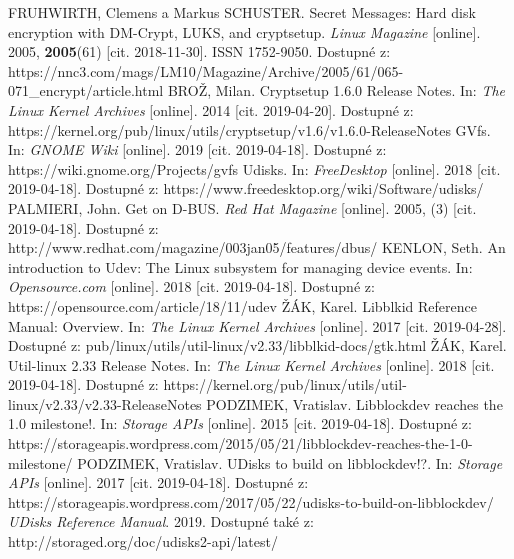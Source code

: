 \documentclass[a4paper,12pt]{article}
\begin{document}
{
FRUHWIRTH, Clemens a Markus SCHUSTER. Secret Messages: Hard disk encryption with DM-Crypt, LUKS, and cryptsetup. \textit{Linux Magazine} [online]. 2005, \textbf{2005}(61) [cit. 2018-11-30]. ISSN 1752-9050. Dostupné z: https://nnc3.com/mags/LM10/Magazine/Archive/2005/61/065-071\_encrypt/article.html
BROŽ, Milan. Cryptsetup 1.6.0 Release Notes. In: \textit{The Linux Kernel Archives} [online]. 2014 [cit. 2019-04-20]. Dostupné z: https://kernel.org/pub/linux/utils/cryptsetup/v1.6/v1.6.0-ReleaseNotes
GVfs. In: \textit{GNOME Wiki} [online]. 2019 [cit. 2019-04-18]. Dostupné z: https://wiki.gnome.org/Projects/gvfs
Udisks. In: \textit{FreeDesktop} [online]. 2018 [cit. 2019-04-18]. Dostupné z: https://www.freedesktop.org/wiki/Software/udisks/
PALMIERI, John. Get on D-BUS. \textit{Red Hat Magazine} [online]. 2005, (3) [cit. 2019-04-18]. Dostupné z: http://www.redhat.com/magazine/003jan05/features/dbus/
KENLON, Seth. An introduction to Udev: The Linux subsystem for managing device events. In: \textit{Opensource.com} [online]. 2018 [cit. 2019-04-18]. Dostupné z: https://opensource.com/article/18/11/udev
ŽÁK, Karel. Libblkid Reference Manual: Overview. In: \textit{The Linux Kernel Archives} [online]. 2017 [cit. 2019-04-28]. Dostupné z: pub/linux/utils/util-linux/v2.33/libblkid-docs/gtk.html
ŽÁK, Karel. Util-linux 2.33 Release Notes. In: \textit{The Linux Kernel Archives} [online]. 2018 [cit. 2019-04-18]. Dostupné z: https://kernel.org/pub/linux/utils/util-linux/v2.33/v2.33-ReleaseNotes
PODZIMEK, Vratislav. Libblockdev reaches the 1.0 milestone!. In: \textit{Storage APIs} [online]. 2015 [cit. 2019-04-18]. Dostupné z: https://storageapis.wordpress.com/2015/05/21/libblockdev-reaches-the-1-0-milestone/
PODZIMEK, Vratislav. UDisks to build on libblockdev!?. In: \textit{Storage APIs} [online]. 2017 [cit. 2019-04-18]. Dostupné z: https://storageapis.wordpress.com/2017/05/22/udisks-to-build-on-libblockdev/
\textit{UDisks Reference Manual}. 2019. Dostupné také z: http://storaged.org/doc/udisks2-api/latest/
}





\seznamobr  %


\seznamtab  %




\end{document}
